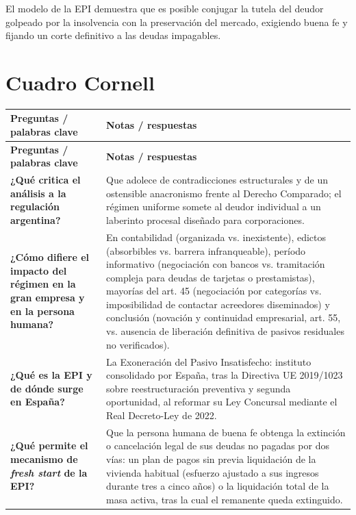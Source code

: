\documentclass[12pt,oneside]{book}
\begin{document}
El modelo de la EPI demuestra que es posible conjugar la tutela del deudor golpeado por la insolvencia con la preservación del mercado, exigiendo buena fe y fijando un corte definitivo a las deudas impagables.

\section{Cuadro Cornell}

\begin{longtable}{
    >{\raggedright\arraybackslash}p{}
    >{\raggedright\arraybackslash}p{}
}
\toprule
\textbf{Preguntas / palabras clave} & \textbf{Notas / respuestas} \\
\midrule
\endfirsthead
\toprule
\textbf{Preguntas / palabras clave} & \textbf{Notas / respuestas} \\
\midrule
\endhead
\bottomrule
\endfoot

\textbf{¿Qué critica el análisis a la regulación argentina?} &
Que adolece de contradicciones estructurales y de un ostensible anacronismo frente al Derecho Comparado; el régimen uniforme somete al deudor individual a un laberinto procesal diseñado para corporaciones. \\[0.6em]

\textbf{¿Cómo difiere el impacto del régimen en la gran empresa y en la persona humana?} &
En contabilidad (organizada vs. inexistente), edictos (absorbibles vs. barrera infranqueable), período informativo (negociación con bancos vs. tramitación compleja para deudas de tarjetas o prestamistas), mayorías del art. 45 (negociación por categorías vs. imposibilidad de contactar acreedores diseminados) y conclusión (novación y continuidad empresarial, art. 55, vs. ausencia de liberación definitiva de pasivos residuales no verificados). \\[0.6em]

\textbf{¿Qué es la EPI y de dónde surge en España?} &
La Exoneración del Pasivo Insatisfecho: instituto consolidado por España, tras la Directiva UE 2019/1023 sobre reestructuración preventiva y segunda oportunidad, al reformar su Ley Concursal mediante el Real Decreto-Ley de 2022. \\[0.6em]

\textbf{¿Qué permite el mecanismo de \textit{fresh start} de la EPI?} &
Que la persona humana de buena fe obtenga la extinción o cancelación legal de sus deudas no pagadas por dos vías: un plan de pagos sin previa liquidación de la vivienda habitual (esfuerzo ajustado a sus ingresos durante tres a cinco años) o la liquidación total de la masa activa, tras la cual el remanente queda extinguido. \\[0.6em]


\end{longtable}
\end{document}
